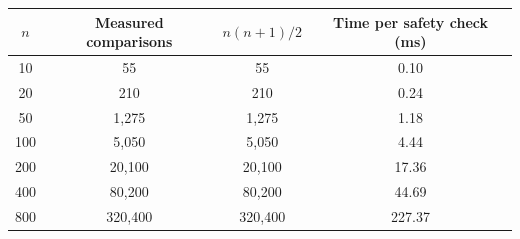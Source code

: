 \begin{tabular}{|c|c|c|c|}
\hline
\textbf{$n$} & \textbf{Measured comparisons} & \textbf{$n(n+1)/2$} & \textbf{Time per safety check (ms)} \\ \hline
10 & 55 & 55 & 0.10 \\
20 & 210 & 210 & 0.24 \\
50 & 1{,}275 & 1{,}275 & 1.18 \\
100 & 5{,}050 & 5{,}050 & 4.44 \\
200 & 20{,}100 & 20{,}100 & 17.36 \\
400 & 80{,}200 & 80{,}200 & 44.69 \\
800 & 320{,}400 & 320{,}400 & 227.37 \\
\hline
\end{tabular}
